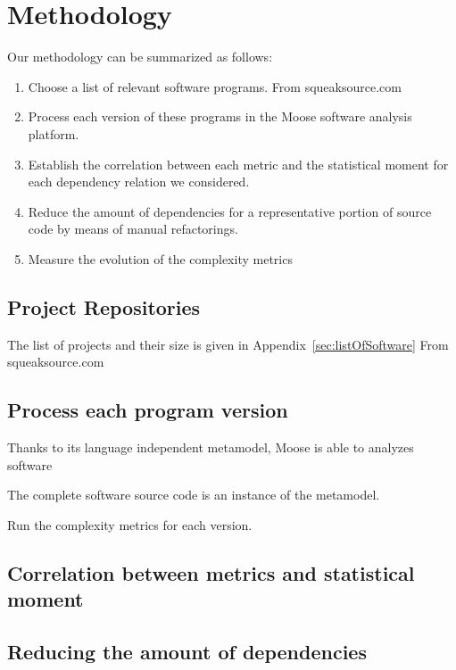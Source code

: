 \documentclass{sig-alternate}
\newcommand{\seclabel}[1]{\label{sec:#1}}
\newcommand{\appref}[1]{Appendix~\ref{sec:#1}}
\begin{document}
\section{Methodology}\seclabel{methodology}

Our methodology can be summarized as follows:

\begin{enumerate}
\item Choose a list of relevant software programs. From squeaksource.com
\item Process each version of these programs in the Moose software analysis platform. 
\item Establish the correlation between each metric and the statistical moment for each dependency relation we considered.
\item Reduce the amount of dependencies for a representative portion of source code by means of manual refactorings.
\item Measure the evolution of the complexity metrics
\end{enumerate}

\subsection{Project Repositories}

The list of projects and their size is given in \appref{listOfSoftware}
From squeaksource.com


\subsection{Process each program version}

Thanks to its language independent metamodel, Moose is able to analyzes software

The complete software source code is an instance of the metamodel.

Run the complexity metrics for each version.

\subsection{Correlation between metrics and statistical moment}

\subsection{Reducing the amount of dependencies}
\end{document}
